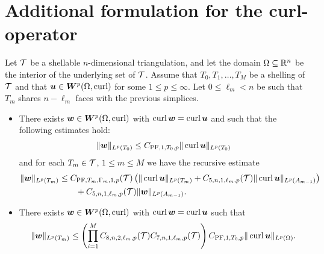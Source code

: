 \documentclass[10pt,a4paper]{article}
\begin{document}
\section{Additional formulation for the curl-operator}



\begin{theorem}\label{theorem:poincarefriedrichsestimate:curl}
    Let ${\mathcal T}$ be a shellable $n$-dimensional triangulation, 
    and let the domain $\Omega \subseteq {\mathbb R}^{n}$ be the interior of the underlying set of ${\mathcal T}$.
    Assume that $T_0, T_1, \dots, T_M$ be a shelling of ${\mathcal T}$ and that $\bm{u} \in \bm{W}^{p}(\Omega,\operatorname{curl})$ for some $1 \leq p \leq \infty$.
    Let $0 \leq \ell_{m} < n$ be such that $T_{m}$ shares $n - \ell_{m}$ faces with the previous simplices.
    \begin{itemize}
        \item 
        There exists $\bm{w} \in \bm{W}^{p}(\Omega,\operatorname{curl})$ with $\operatorname{curl} \bm{w} = \operatorname{curl} \bm{u}$
        and such that the following estimates hold:
        \begin{gather*}
            \| \bm{w} \|_{L^{p}(T_{0})} \leq C_{{{\rm PF}},1,T_{0},p} \| \operatorname{curl} \bm{u} \|_{L^{p}(T_{0})}
        \end{gather*}
        and for each $T_{m} \in {\mathcal T}$, $1 \leq m \leq M$ we have the recursive estimate 
        \begin{align*}
            \| \bm{w} \|_{L^{p}(T_{m})}
            &
            \leq  
            C_{{\rm PF},T_{m},\Gamma_{m},1,p}({\mathcal T}) 
            \left( 
                \| \operatorname{curl} \bm{u}      \|_{L^{p}(T_{m})} 
                +
                C_{5,n,1,\ell_{m},p}({\mathcal T})
                \| \operatorname{curl} \bm{u} \|_{L^{p}(A_{m-1})}
            \right)
            \\&\qquad
            + 
            C_{5,n,1,\ell_{m},p}({\mathcal T})
            \| \bm{w} \|_{L^{p}(A_{m-1})}
            .
        \end{align*}
        \item 
        There exists $\bm{w} \in \bm{W}^{p}(\Omega,\operatorname{curl})$ with $\operatorname{curl} \bm{w} = \operatorname{curl} \bm{u}$ 
        such that 
        \begin{align*}
            \| \bm{w} \|_{L^{p}(T_{m})}
            \leq 
            \left( 
            \prod_{i=1}^{M}
            C_{8,n,2,\ell_{m},p}({\mathcal T})
            C_{7,n,1,\ell_{m},p}({\mathcal T})
            \right)
            C_{{{\rm PF}},1,T_{0},p}
            \| \operatorname{curl} \bm{u} \|_{L^{p}(\Omega)}
            .
        \end{align*}
    \end{itemize}
\end{theorem}
\end{document}
